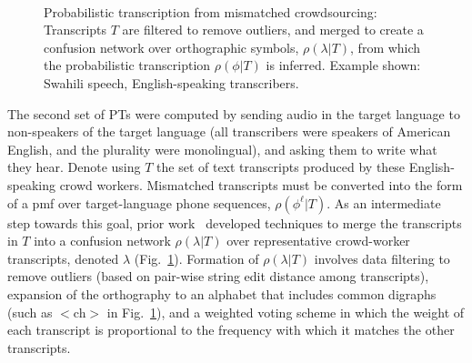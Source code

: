 \begin{figure}[b!]
\begin{center}
\\
\end{center}
\setlength{\abovecaptionskip}{0pt}
\caption{Probabilistic transcription from mismatched crowdsourcing:
  Transcripts $T$ are filtered to remove outliers, and merged to
  create a confusion network over orthographic symbols,
  $\rho(\lambda|T)$, from which the probabilistic transcription
  $\rho(\phi|T)$ is inferred. Example shown: Swahili speech,
  English-speaking transcribers.}
\label{fig:mcmethods}
\end{figure}

The second set of PTs were computed by sending audio in the target
language to non-speakers of the target language (all transcribers were
speakers of American English, and the plurality were monolingual), and
asking them to write what they hear.  Denote using $T$ the set of text
transcripts produced by these English-speaking crowd workers.
Mismatched transcripts must be converted into the form of a pmf over
target-language phone sequences, $\rho(\phi^\ell|T)$.  As an
intermediate step towards this goal, prior work~\cite{JHJ15b}
developed techniques to merge the transcripts in $T$ into a confusion
network $\rho(\lambda|T)$ over representative crowd-worker
transcripts, denoted $\lambda$ (Fig.~\ref{fig:mcmethods}).  Formation
of $\rho(\lambda|T)$ involves data filtering to remove outliers (based
on pair-wise string edit distance among transcripts), expansion of the
orthography to an alphabet that includes common digraphs (such as
$<$ch$>$ in Fig.~\ref{fig:mcmethods}), and a weighted voting scheme in
which the weight of each transcript is proportional to the frequency
with which it matches the other transcripts.

